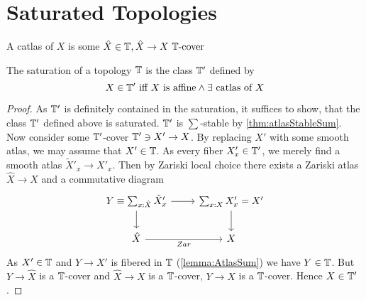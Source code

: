 

\section{Saturated Topologies}

\begin{definition}
	A catlas of $X$ is  some $\hat X \in \mathbb{T} , \hat X \to X \text{ $\mathbb{T}$-cover }$
\end{definition}
\begin{prop}
	The saturation of a topology $\mathbb{T}$ is the class $\mathbb{T}'$ defined by 
		\[
		X \in \mathbb{T}' \text{ iff $X$ is affine} \land \exists \text{ catlas of } X 
		\]


	
\end{prop}
\begin{proof}
	As $\mathbb{T}'$ is definitely contained in the saturation, it suffices to show, that the class $\mathbb{T}'$ defined above is saturated.
	$\mathbb{T}'$ is $\sum$-stable by \ref{thm:atlasStableSum}. \\
	Now consider some $\mathbb{T}'$-cover $\mathbb{T}' \ni X' \to X$. By replacing $X'$ with some smooth atlas, we may assume that $X' \in \mathbb{T}$. As every fiber $X'_x \in \mathbb{T}'$, we merely find a smooth atlas $\tilde X'_x \to X'_x$. Then by Zariski local choice there exists a Zariski atlas $\hat X \to X$ and a commutative diagram 
	\[\begin{tikzcd}
		Y \equiv {\sum_{x : \hat X}\tilde X'_x} & {\sum_{x : X}X'_x} = X' \\
		{\hat X} & X
		\arrow[from=1-1, to=1-2]
		\arrow[from=1-1, to=2-1]
		\arrow[from=1-2, to=2-2]
		\arrow["Zar"', from=2-1, to=2-2]
	\end{tikzcd}\]
	As $X' \in \mathbb{T}$ and $Y \to X'$ is fibered in $\mathbb{T}$ (\ref{lemma:AtlasSum}) we have $Y \in \mathbb{T}$. But $Y \to \hat X$ is a $\mathbb{T}$-cover and $\hat X \to X$ is a $\mathbb{T}$-cover, $Y \to X$ is a $\mathbb{T}$-cover. Hence $X \in \mathbb{T}'$.%
	
\end{proof}
